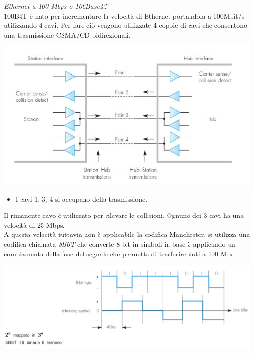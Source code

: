 \documentclass[11pt, oneside]{article}   	%
\begin{document}
\emph{Ethernet a 100 Mbps o 100Base4T}\\
100B4T è nato per incrementare la velocità di Ethernet portandola a 100Mbit/s utilizzando 4 cavi. Per fare ciò vengono utilizzate 4 coppie di cavi che consentono una trasmissione CSMA/CD bidirezionali.
\begin{center}
\includegraphics[scale=0.5]{eth}
\end{center}
\begin{itemize}
\item I cavi 1, 3, 4 si occupano della trasmissione.
\end{itemize}
Il rimanente cavo è utilizzato per rilevare le collisioni. Ognuno dei 3 cavi ha una velocità di 25 Mbps.\\
A questa velocità tuttavia non è applicabile la codifica Manchester, si utilizza una codifica chiamata \emph{8B6T} che converte 8 bit in simboli in base 3 applicando un cambiamento della fase del segnale che permette di trasferire dati a 100 Mbs
\begin{center}
\includegraphics[scale=0.5]{eth2}
\end{center}
\end{document}
